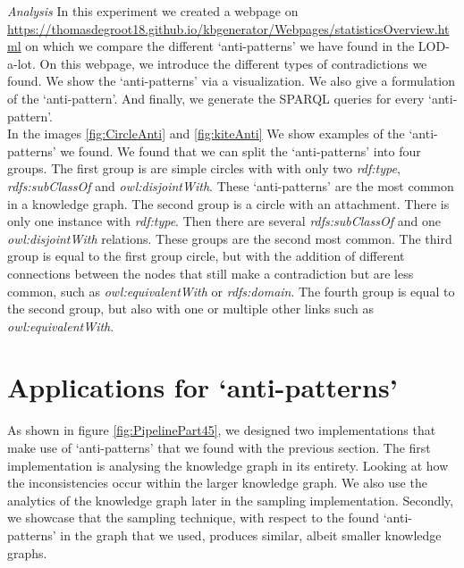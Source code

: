 \documentclass[11pt,letterpaper ,oneside ]{book}
\begin{document}
	\textit{Analysis} In this experiment we created a webpage on\\ \url{https://thomasdegroot18.github.io/kbgenerator/Webpages/statisticsOverview.html} on which we compare the different `anti-patterns' we have found in the LOD-a-lot. On this webpage, we introduce the different types of contradictions we found. We show the `anti-patterns' via a visualization. We also give a formulation of the `anti-pattern'. And finally, we generate the SPARQL queries for every `anti-pattern'.  \\
	In the images \ref{fig:CircleAnti} and \ref{fig:kiteAnti} We show examples of the `anti-patterns' we found. We found that we can split the `anti-patterns' into four groups. The first group is are simple circles with with only two \textit{rdf:type}, \textit{rdfs:subClassOf} and \textit{owl:disjointWith}. These `anti-patterns' are the most common in a knowledge graph. The second group is a circle with an attachment. There is only one instance with \textit{rdf:type}. Then there are several \textit{rdfs:subClassOf} and one \textit{owl:disjointWith} relations. These groups are the second most common.  The third group is equal to the first group circle, but with the addition of different connections between the nodes that still make a contradiction but are less common, such as \textit{owl:equivalentWith} or \textit{rdfs:domain}. The fourth group is equal to the second group, but also with one or multiple other links such as \textit{owl:equivalentWith}. \\
	\newpage
	
	\chapter{Applications for `anti-patterns'}\label{Implementation}
	As shown in figure \ref{fig:PipelinePart45}, we designed two implementations that make use of `anti-patterns' that we found with the previous section. The first implementation is analysing the knowledge graph in its entirety. Looking at how the inconsistencies occur within the larger knowledge graph. We also use the analytics of the knowledge graph later in the sampling implementation. Secondly, we showcase that the sampling technique, with respect to the found `anti-patterns' in the graph that we used, produces similar, albeit smaller knowledge graphs.
	
\end{document}
